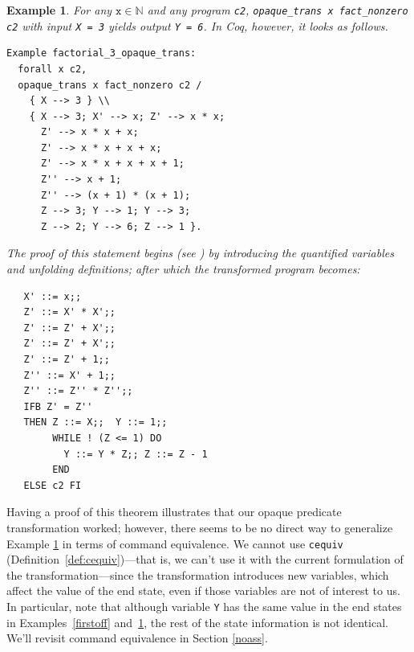 \documentclass[compsoc,conference,a4paper,10pt,times]{IEEEtran}
\newtheorem{example}[theorem]{Example}
\begin{document}
\begin{example}\label{firstfact}
    For any $\mathtt{x}\in \mathbb{N}$ and any program \texttt{c2}, \texttt{opaque\_trans x fact\_nonzero c2} with input \texttt{X = 3} yields output \texttt{Y = 6}.  In Coq, however, it looks as follows.
\begin{verbatim}
Example factorial_3_opaque_trans:
  forall x c2, 
  opaque_trans x fact_nonzero c2 /
    { X --> 3 } \\
    { X --> 3; X' --> x; Z' --> x * x; 
      Z' --> x * x + x; 
      Z' --> x * x + x + x;
      Z' --> x * x + x + x + 1; 
      Z'' --> x + 1; 
      Z'' --> (x + 1) * (x + 1); 
      Z --> 3; Y --> 1; Y --> 3; 
      Z --> 2; Y --> 6; Z --> 1 }.
\end{verbatim}

The proof of this statement begins (see \cite{WeiRepo}) by introducing the quantified variables and unfolding definitions; after which the transformed program becomes: 
\begin{verbatim}
   X' ::= x;;
   Z' ::= X' * X';;
   Z' ::= Z' + X';;
   Z' ::= Z' + X';;
   Z' ::= Z' + 1;;
   Z'' ::= X' + 1;;
   Z'' ::= Z'' * Z'';;
   IFB Z' = Z'' 
   THEN Z ::= X;;  Y ::= 1;;
        WHILE ! (Z <= 1) DO
          Y ::= Y * Z;; Z ::= Z - 1 
        END
   ELSE c2 FI
\end{verbatim}
\end{example}

Having a proof of this theorem illustrates that our opaque predicate transformation worked; however, there seems to be no direct way to generalize Example \ref{firstfact} in terms of command equivalence. We cannot use \texttt{cequiv} (Definition~\ref{def:cequiv})---that is, we can't use it with the current formulation of the transformation---since the transformation introduces new variables, which affect the value of the end state, even if those variables are not of interest to us. In particular, note that although variable \texttt{Y} has the same value in the end states in Examples~\ref{firstoff} and~\ref{firstfact}, the rest of the state information is not identical. We'll revisit command equivalence in Section \ref{noass}.
      
\end{document}
